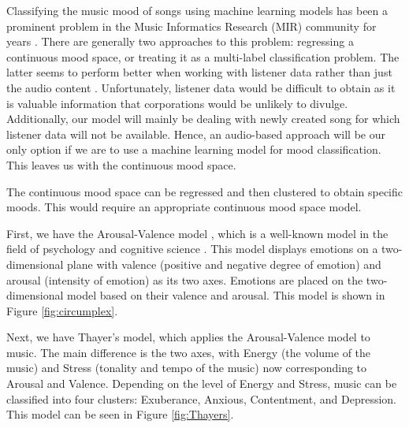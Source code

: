 

Classifying the music mood of songs using machine learning models has been a prominent problem in the Music Informatics Research (MIR) community for years \cite{MIRMood}. There are generally two approaches to this problem: regressing a continuous mood space, or treating it as a multi-label classification problem. The latter seems to perform better when working with listener data rather than just the audio content \cite{ListeningData}. Unfortunately, listener data would be difficult to obtain as it is valuable information that corporations would be unlikely to divulge. Additionally, our model will mainly be dealing with newly created song for which listener data will not be available. Hence, an audio-based approach will be our only option if we are to use a machine learning model for mood classification. This leaves us with the continuous mood space.


The continuous mood space can be regressed and then clustered to obtain specific moods. This would require an appropriate continuous mood space model.

First, we have the Arousal-Valence model \cite{circumplex}, which is a well-known model in the field of psychology and cognitive science \cite{circumplexbook} \cite{circumplex3}. This model displays emotions on a two-dimensional plane with valence (positive and negative degree of emotion) and arousal (intensity of emotion) as its two axes. Emotions are placed on the two-dimensional model based on their valence and arousal. This model is shown in Figure \ref{fig:circumplex}.

Next, we have Thayer's model, which applies the Arousal-Valence model to music. The main difference is the two axes, with Energy (the volume of the music) and Stress (tonality and tempo of the music) now corresponding to Arousal and Valence. Depending on the level of Energy and Stress, music can be classified into four clusters: Exuberance, Anxious, Contentment, and Depression. This model can be seen in Figure \ref{fig:Thayers}.

